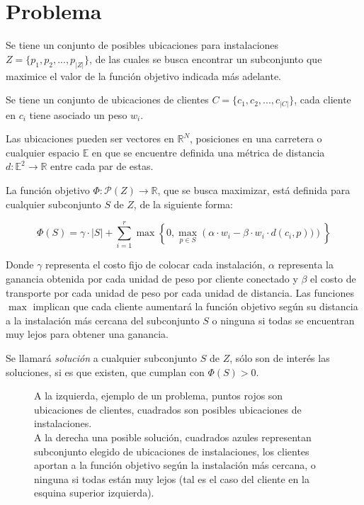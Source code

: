 \section{Problema}


Se tiene un conjunto de posibles ubicaciones para instalaciones $Z = \{p_1,p_2,...,p_{|Z|}\}$, de las cuales se busca encontrar un subconjunto que maximice el valor de la función objetivo indicada más adelante.

Se tiene un conjunto de ubicaciones de clientes $C = \{c_1,c_2,...,c_{|C|}\}$, cada cliente en $c_i$ tiene asociado un peso $w_i$.

Las ubicaciones pueden ser vectores en $\mathbb{R}^N$, posiciones en una carretera o cualquier espacio $\mathbb{E}$ en que se encuentre definida una métrica de distancia $d : \mathbb{E}^2 \rightarrow \mathbb{R}$ entre cada par de estas.

La función objetivo $\Phi : \mathcal{P}(Z) \rightarrow \mathbb{R}$, que se busca maximizar, está definida para cualquier subconjunto $S$ de $Z$, de la siguiente forma:

\begin{equation}
\Phi(S) = \gamma \cdot |S| + \sum_{i=1}^r \max \left\{0 , \max_{p \in S} \left(
    \alpha \cdot w_i - \beta \cdot w_i \cdot d(c_i,p))
\right) \right\}
\end{equation}

Donde $\gamma$ representa el costo fijo de colocar cada instalación, $\alpha$ representa la ganancia obtenida por cada unidad de peso por cliente conectado y $\beta$ el costo de transporte por cada unidad de peso por cada unidad de distancia. Las funciones $\max$ implican que cada cliente aumentará la función objetivo según su distancia a la instalación más cercana del subconjunto $S$ o ninguna si todas se encuentran muy lejos para obtener una ganancia.

Se llamará \emph{solución} a cualquier subconjunto $S$ de $Z$, sólo son de interés las soluciones, si es que existen, que cumplan con $\Phi(S) > 0$.

\begin{figure}%
    \centering
    \qquad \qquad \qquad
    \caption{A la izquierda, ejemplo de un problema, puntos rojos son ubicaciones de clientes, cuadrados son posibles ubicaciones de instalaciones.\\A la derecha una posible solución, cuadrados azules representan subconjunto elegido de ubicaciones de instalaciones, los clientes aportan a la función objetivo según la instalación más cercana, o ninguna si todas están muy lejos (tal es el caso del cliente en la esquina superior izquierda).}
    \label{fig:algorithm}
\end{figure}
